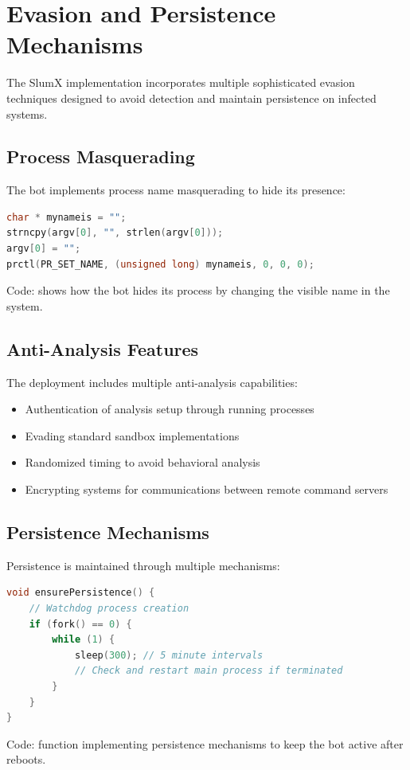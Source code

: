 \documentclass[12pt,letterpaper]{report}
\begin{document}
\section{Evasion and Persistence Mechanisms}

The SlumX implementation incorporates multiple sophisticated evasion techniques designed to avoid detection and maintain persistence on infected systems.

\subsection{Process Masquerading}

The bot implements process name masquerading to hide its presence:

\begin{lstlisting}[language=C, caption=Process Masquerading]
char * mynameis = "";
strncpy(argv[0], "", strlen(argv[0]));
argv[0] = "";
prctl(PR_SET_NAME, (unsigned long) mynameis, 0, 0, 0);
\end{lstlisting}
\begin{center}\small Code: shows how the bot hides its process by changing the visible name in the system.\end{center}

\subsection{Anti-Analysis Features}

The deployment includes multiple anti-analysis capabilities: 

\begin{itemize}
    \item Authentication of analysis setup through running processes 
    \item Evading standard sandbox implementations
    \item Randomized timing to avoid behavioral analysis
    \item Encrypting systems for communications between remote command servers 
\end{itemize}

\subsection{Persistence Mechanisms}

Persistence is maintained through multiple mechanisms:

\begin{lstlisting}[language=C, caption=Persistence Implementation]
void ensurePersistence() {
    // Watchdog process creation
    if (fork() == 0) {
        while (1) {
            sleep(300); // 5 minute intervals
            // Check and restart main process if terminated
        }
    }
}
\end{lstlisting}
\begin{center}\small Code: function implementing persistence mechanisms to keep the bot active after reboots.\end{center}
\end{document}
